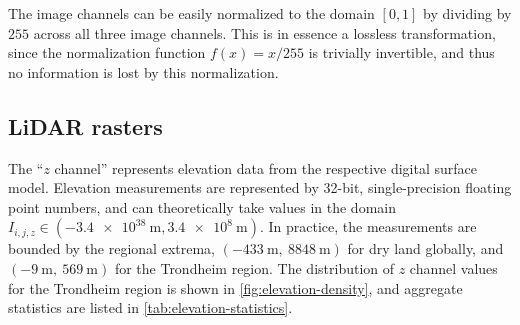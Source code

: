 The image channels can be easily normalized to the domain $[0, 1]$ by dividing by $255$ across all three image channels.
This is in essence a lossless transformation, since the normalization function $f(x) = x/255$ is trivially invertible, and thus no information is lost by this normalization.

\subsection{LiDAR rasters}

The \enquote{$z$ channel} represents elevation data from the respective digital surface model.
Elevation measurements are represented by 32-bit, single-precision floating point numbers, and can theoretically take values in the domain $I_{i,j,z} \in (\SI{-3.4e38}{\meter},\allowbreak\SI{3.4e8}{\meter})$.
In practice, the measurements are bounded by the regional extrema, $(\SI{-433}{\meter},~\SI{8848}{\meter})$ for dry land globally, and $(\SI{-9}{\meter},~\SI{569}{\meter})$ for the Trondheim region.
The distribution of $z$ channel values for the Trondheim region is shown in \cref{fig:elevation-density}, and aggregate statistics are listed in \cref{tab:elevation-statistics}.

\begin{figure}[H]
  \begin{floatrow}
    \hspace{-1.8em}
  \end{floatrow}
\end{figure}

